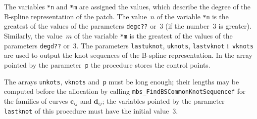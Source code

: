 The variables \texttt{*n} and \texttt{*m} are assigned the values, which describe
the degree of the B-spline representation of the patch. The value~$n$ of the
variable \texttt{*n} is the greatest of the values of the parameters
\texttt{degc??} or~$3$ (if the number~$3$ is greater).
Similarly, the value~$m$ of the variable \texttt{*m} is the greatest
of the values of the parameters \texttt{degd??} or~$3$. The parameters
\texttt{lastuknot}, \texttt{uknots}, \texttt{lastvknot} i~\texttt{vknots}
are used to output the knot sequences of the B-spline representation.
In the array pointed by the parameter~\texttt{p} the procedure stores the
control points.

The arrays \texttt{unkots}, \texttt{vknots} and~\texttt{p} must be long enough;
their lengths may be computed before the allocation by calling
\texttt{mbs\_FindBSCommonKnotSequencef} for the families of curves
$\bm{c}_{ij}$ and $\bm{d}_{ij}$; the variables pointed by the parameter
\texttt{lastknot} of this procedure must have the initial value~$3$.


